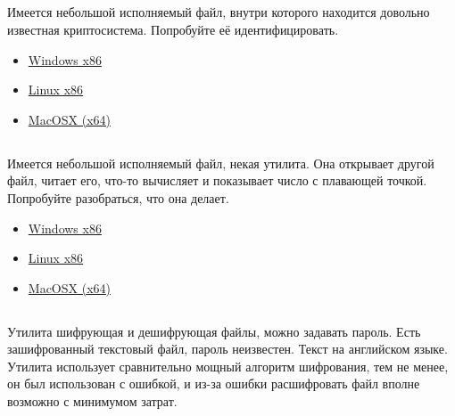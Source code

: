 

\subsection{}

Имеется небольшой исполняемый файл, внутри которого находится довольно известная криптосистема.
Попробуйте её идентифицировать.

\begin{itemize}
\item
\href{http://yurichev.com/RE-tasks/middle/2/unknown_cryptosystem.exe}{Windows x86}

\item
\href{http://yurichev.com/RE-tasks/middle/2/unknown_encryption_linux86.tar}{Linux x86}

\item
\href{http://yurichev.com/RE-tasks/middle/2/unknown_encryption_MacOSX.tar}{MacOSX (x64)}
\end{itemize}

\subsection{}

Имеется небольшой исполняемый файл, некая утилита.
Она открывает другой файл, читает его, что-то вычисляет и показывает число с плавающей точкой.
Попробуйте разобраться, что она делает.

\begin{itemize}
\item
\href{http://yurichev.com/RE-tasks/middle/3/unknown_utility_2_3.exe}{Windows x86}

\item
\href{http://yurichev.com/RE-tasks/middle/3/unknown_utility_2_3_Linux86.tar}{Linux x86}

\item
\href{http://yurichev.com/RE-tasks/middle/3/unknown_utility_2_3_MacOSX.tar}{MacOSX (x64)}
\end{itemize}

\subsection{}

Утилита шифрующая и дешифрующая файлы, можно задавать пароль. Есть зашифрованный текстовый файл, пароль неизвестен.
Текст на английском языке.
Утилита использует сравнительно мощный алгоритм шифрования, тем не менее, он был использован с ошибкой,
и из-за ошибки расшифровать файл вполне возможно с минимумом затрат.

